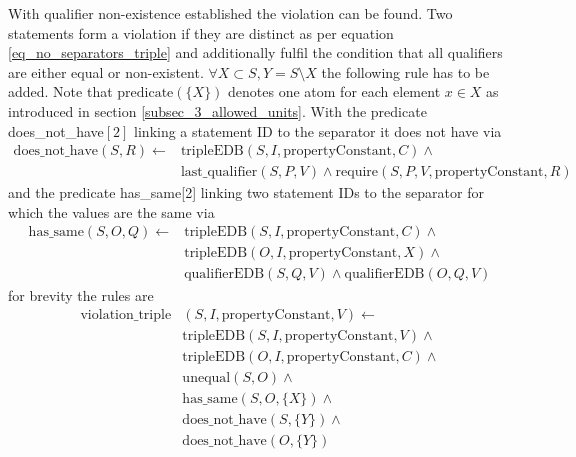 \documentclass[hyperref,bachelorofscience,fleqn]{cgvpub}
\begin{document}
With qualifier non-existence established the violation can be found. Two statements form a violation if they are distinct as per equation \ref{eq_no_separators_triple} and additionally fulfil the condition that all qualifiers are either equal or non-existent. \(\forall X \subset S, Y = S \setminus X\) the following rule has to be added. Note that \(\text{predicate}(\{X\})\) denotes one atom for each element \(x \in X\) as introduced in section \ref{subsec_3_allowed_units}. With the predicate does\_not\_have\([2]\) linking a statement ID to the separator it does not have via 
\begin{equation*}
\begin{split}
\text{does\_not\_have}(S, R) \leftarrow &\text{tripleEDB}(S, I, \text{propertyConstant}, C) \wedge \\
&\text{last\_qualifier}(S, P, V) \wedge \text{require}(S, P, V, \text{propertyConstant}, R)
\end{split}
\end{equation*}
and the predicate has\_same[2] linking two statement IDs to the separator for which the values are the same via
\begin{equation*}
\begin{split}
\text{has\_same}(S, O, Q) \leftarrow &\text{tripleEDB}(S, I, \text{propertyConstant}, C) \wedge \\
&\text{tripleEDB}(O, I, \text{propertyConstant}, X) \wedge \\
&\text{qualifierEDB}(S, Q, V) \wedge \text{qualifierEDB}(O, Q, V)
\end{split}
\end{equation*}
 for brevity the rules are
\begin{equation*}
\begin{split}
\text{violation\_triple}&(S, I, \text{propertyConstant}, V) \leftarrow \\
&\text{tripleEDB}(S, I, \text{propertyConstant}, V) \wedge \\
&\text{tripleEDB}(O, I, \text{propertyConstant}, C) \wedge \\
&\text{unequal}(S, O) \wedge \\
&\text{has\_same}(S, O, \{X\}) \wedge \\
&\text{does\_not\_have}(S, \{Y\}) \wedge \\
&\text{does\_not\_have}(O, \{Y\})
\end{split}
\end{equation*}
\end{document}

